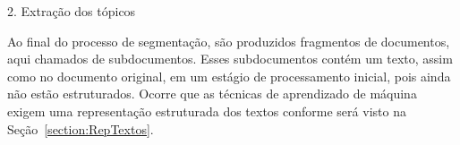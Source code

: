 2. Extração dos tópicos


















Ao final do processo de segmentação, são produzidos fragmentos de documentos, aqui chamados de subdocumentos. Esses subdocumentos contém um texto, assim como no documento original, em um estágio de processamento inicial, pois ainda não estão estruturados. Ocorre que as técnicas de aprendizado de máquina exigem uma representação estruturada dos textos conforme será visto na Seção~\ref{section:RepTextos}.















